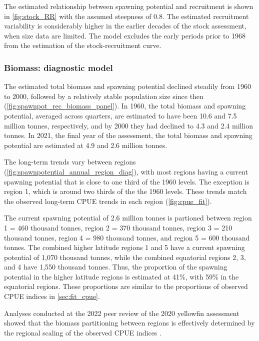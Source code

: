 The estimated relationship between spawning potential and recruitment is shown in \autoref{fig:stock_RR} with the assumed steepness of 0.8. The estimated recruitment variability is considerably higher in the earlier decades of the stock assessment, when size data are limited. The model excludes the early periods prior to 1968 from the estimation of the stock-recruitment curve.

\subsubsection{Biomass: diagnostic model}
\label{sec:biomass_diag}

The estimated total biomass and spawning potential declined steadily from 1960 to 2000, followed by a relatively stable population size since then (\autoref{fig:spawnpot_rec_biomass_panel}). In 1960, the total biomass and spawning potential, averaged across quarters, are estimated to have been 10.6 and 7.5 million tonnes, respectively, and by 2000 they had declined to 4.3 and 2.4 million tonnes. In 2021, the final year of the assessment, the total biomass and spawning potential are estimated at 4.9 and 2.6 million tonnes.

The long-term trends vary between regions (\autoref{fig:spawnpotential_annual_region_diag}), with most regions having a current spawning potential that is close to one third of the 1960 levels. The exception is region 1, which is around two thirds of the the 1960 levels. These trends match the observed long-term CPUE trends in each region (\autoref{fig:cpue_fit}).

The current spawning potential of 2.6 million tonnes is partioned between region 1 = 460 thousand tonnes, region 2 = 370 thousand tonnes, region 3 = 210 thousand tonnes, region 4 = 980 thousand tonnes, and region 5 = 600 thousand tonnes. The combined higher latitude regions 1 and 5 have a current spawning potential of 1,070 thousand tonnes, while the combined equatorial regions 2, 3, and 4 have 1,550 thousand tonnes. Thus, the proportion of the spawning potential in the higher latitude regions is estimated at 41\%, with 59\% in the equatorial regions. These proportions are similar to the proportions of observed CPUE indices in \autoref{sec:fit_cpue}.

Analyses conducted at the 2022 peer review of the 2020 yellowfin assessment showed that the biomass partitioning between regions is effectively determined by the regional scaling of the observed CPUE indices \citep[Figure 6 in][]{punt_independent_2023}.

